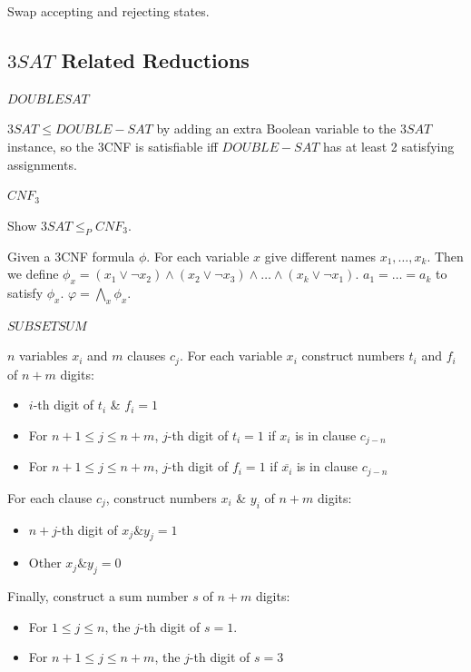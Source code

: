 \documentclass[10pt,landscape,a4paper]{article}
\begin{document}
\begin{multicols*}{3}
Swap accepting and rejecting states.


\subsection{$3SAT$ Related Reductions}

\underline{$DOUBLESAT$}

$3SAT \leq DOUBLE-SAT$ by adding an extra Boolean variable to the $3SAT$ instance, so the 3CNF is satisfiable iff $DOUBLE-SAT$ has at least 2 satisfying assignments.

\underline{$CNF_3$}

Show $3SAT \leq_P CNF_3$.

Given a 3CNF formula $\phi$. For each variable $x$ give different names $x_1, \ldots, x_k$. Then we define $\phi_x = (x_1 \vee \neg x_2) \wedge (x_2 \vee \neg x_3) \wedge \ldots \wedge (x_k \vee \neg x_1)$. $a_1 = \ldots = a_k$ to satisfy $\phi_x$. $\varphi = \bigwedge_x \phi_x$.

\underline{$SUBSETSUM$}

$n$ variables $x_i$ and $m$ clauses $c_j$. For each variable $x_i$ construct numbers $t_i$ and $f_i$ of $n + m$ digits:

\begin{itemize}
    \item $i$-th digit of $t_i$ \& $f_i = 1$
    \item For $n + 1 \leq j \leq n + m$, $j$-th digit of $t_i = 1$ if $x_i$ is in clause $c_{j-n}$
    \item For $n + 1 \leq j \leq n + m$, $j$-th digit of $f_i = 1$ if $\overline{x_i}$ is in clause $c_{j-n}$
\end{itemize}

For each clause $c_j$, construct numbers $x_i$ \& $y_i$ of $n + m$ digits:

\begin{itemize}
    \item $n+j$-th digit of $x_j \& y_j = 1$
    \item Other $x_j \& y_j = 0$
\end{itemize}

Finally, construct a sum number $s$ of $n + m$ digits:

\begin{itemize}
    \item For $1 \leq j \leq n$, the $j$-th digit of $s = 1$.
    \item For $n + 1 \leq j \leq n + m$, the $j$-th digit of $s = 3$
\end{itemize}


\end{multicols*}
\end{document}
